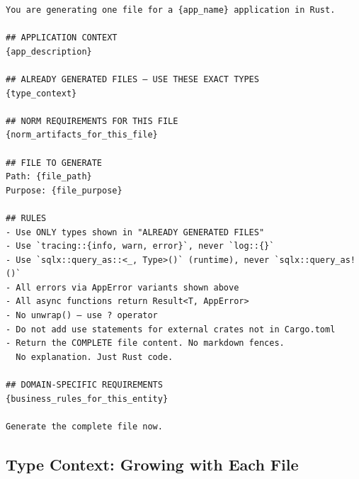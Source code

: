 \documentclass[11pt,a4paper]{article}
\begin{document}
\begin{lstlisting}[title=Universal Prompt Template]
You are generating one file for a {app_name} application in Rust.

## APPLICATION CONTEXT
{app_description}

## ALREADY GENERATED FILES — USE THESE EXACT TYPES
{type_context}

## NORM REQUIREMENTS FOR THIS FILE
{norm_artifacts_for_this_file}

## FILE TO GENERATE
Path: {file_path}
Purpose: {file_purpose}

## RULES
- Use ONLY types shown in "ALREADY GENERATED FILES"
- Use `tracing::{info, warn, error}`, never `log::{}`
- Use `sqlx::query_as::<_, Type>()` (runtime), never `sqlx::query_as!()`
- All errors via AppError variants shown above
- All async functions return Result<T, AppError>
- No unwrap() — use ? operator
- Do not add use statements for external crates not in Cargo.toml
- Return the COMPLETE file content. No markdown fences.
  No explanation. Just Rust code.

## DOMAIN-SPECIFIC REQUIREMENTS
{business_rules_for_this_entity}

Generate the complete file now.
\end{lstlisting}

\subsection{Type Context: Growing with Each File}
\end{document}
